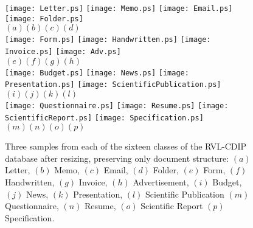 \documentclass[10pt,conference,a4paper]{IEEEtran}
\begin{document}
\begin{figure*}[t]
	\begin{center}
		\texttt{[image: Letter.ps]}
		\hfill  \texttt{[image: Memo.ps]}
		\hfill  \texttt{[image: Email.ps]}
		\hfill  \texttt{[image: Folder.ps]}\\
		$(a)$\hspace*{4cm}$(b)$\hspace*{4cm}$(c)$\hspace*{4cm}$(d)$\\
		\vspace*{.25cm}
		\texttt{[image: Form.ps]}
		\hfill  \texttt{[image: Handwritten.ps]}
		\hfill  \texttt{[image: Invoice.ps]}
		\hfill  \texttt{[image: Adv.ps]}\\
		$(e)$\hspace*{4cm}$(f)$\hspace*{4cm}$(g)$\hspace*{4cm}$(h)$\\
		\vspace*{.25cm}
		\texttt{[image: Budget.ps]}
		\hfill  \texttt{[image: News.ps]}
		\hfill  \texttt{[image: Presentation.ps]}
		\hfill  \texttt{[image: ScientificPublication.ps]}\\
		$(i)$\hspace*{4cm}$(j)$\hspace*{4cm}$(k)$\hspace*{4cm}$(l)$\\
		\vspace*{.25cm}
		\texttt{[image: Questionnaire.ps]}
		\hfill  \texttt{[image: Resume.ps]}
		\hfill  \texttt{[image: ScientificReport.ps]}
		\hfill  \texttt{[image: Specification.ps]}\\
		$(m)$\hspace*{4cm}$(n)$\hspace*{4cm}$(o)$\hspace*{4cm}$(p)$\\
		\caption{Three samples from each of the sixteen classes of the RVL-CDIP database after resizing, preserving only document structure: $(a)$ Letter, $(b)$ Memo, $(c)$ Email, $(d)$ Folder, $(e)$ Form, $(f)$ Handwritten, $(g)$ Invoice, $(h)$ Advertisement, $(i)$ Budget, $(j)$ News, $(k)$ Presentation, $(l)$ Scientific Publication $(m)$ Questionnaire, $(n)$ Resume, $(o)$ Scientific Report $(p)$ Specification.} \label{fig:datasheet}
	\end{center}
	\vspace*{-3mm}
\end{figure*}
\end{document}
